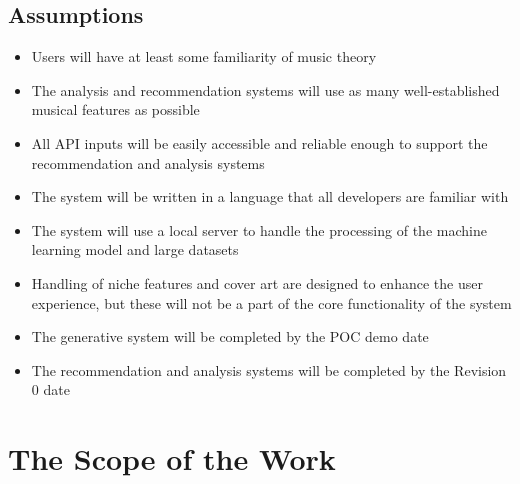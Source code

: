 \documentclass[12pt]{article}
\begin{document}
\subsection{Assumptions}
\begin{itemize}
  \item Users will have at least some familiarity of music theory
  \item The analysis and recommendation systems will use as many well-established musical 
  features as possible
  \item All API inputs will be easily accessible and reliable enough to support the
  recommendation and analysis systems
  \item The system will be written in a language that all developers are familiar with
  \item The system will use a local server to handle the processing of
  the machine learning model and large datasets
  \item Handling of niche features and cover art are designed to enhance the user experience, but 
  these will not be a part of the core functionality of the system
  \item The generative system will be completed by the POC demo date
  \item The recommendation and analysis systems will be completed by the Revision 0 date
\end{itemize}

\section{The Scope of the Work}
\end{document}
